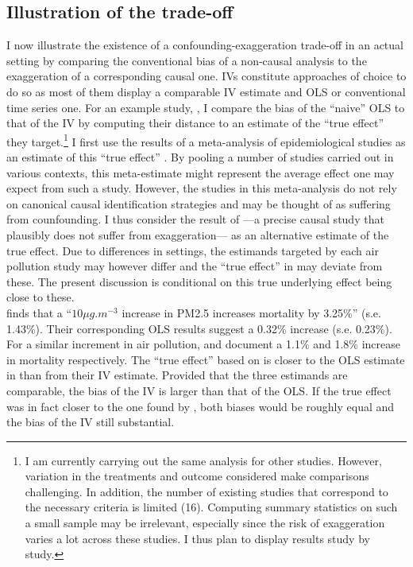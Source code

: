 \documentclass[usletter, 12pt]{article}
\begin{document}
			 
	\subsection{Illustration of the trade-off}
	
		I now illustrate the existence of a confounding-exaggeration trade-off in an actual setting by comparing the conventional bias of a non-causal analysis to the exaggeration of a corresponding causal one. IVs constitute approaches of choice to do so as most of them display a comparable IV estimate and OLS or conventional time series one. For an example study, \cite{he_straw_2020}, I compare the bias of the ``naive'' OLS to that of the IV by computing their distance to an estimate of the ``true effect'' they target.\footnote{I am currently carrying out the same analysis for other studies. However, variation in the treatments and outcome considered make comparisons challenging. In addition, the number of existing studies that correspond to the necessary criteria is limited (16). Computing summary statistics on such a small sample may be irrelevant, especially since the risk of exaggeration varies a lot across these studies. I thus plan to display results study by study.} %
		I first use the results of a meta-analysis of epidemiological studies as an estimate of this ``true effect'' \citep{shah_short_2015}. By pooling a number of studies carried out in various contexts, this meta-estimate might represent the average effect one may expect from such a study.  However, the studies in this meta-analysis do not rely on canonical causal identification strategies and may be thought of as suffering from counfounding. I thus consider the result of \cite{deryugina_mortality_2019}---a precise causal study that plausibly does not suffer from exaggeration--- as an alternative estimate of the true effect. Due to differences in settings, the estimands targeted by each air pollution study may however differ and the ``true effect'' in %
		\cite{he_straw_2020} may deviate from these. 
		The present discussion is conditional on this true underlying effect being close to these.\\
		
		\cite{he_straw_2020} finds that a ``$10 \mu g.m^{-3}$ increase in PM2.5 increases mortality by 3.25\%'' (s.e. 1.43\%). Their corresponding OLS results suggest a 0.32\% increase (s.e. 0.23\%). 
For a similar increment in air pollution, \cite{shah_short_2015} and \cite{deryugina_mortality_2019} document a 1.1\% and 1.8\% increase in mortality respectively. The ``true effect'' based on \cite{shah_short_2015} is closer to the OLS estimate in \cite{he_straw_2020} than from their IV estimate. Provided that the three estimands are comparable, the bias of the IV is larger than that of the OLS. If the true effect was in fact closer to the one found by \cite{deryugina_mortality_2019}, both biases would be roughly equal and the bias of the IV still substantial.
		
\end{document}
